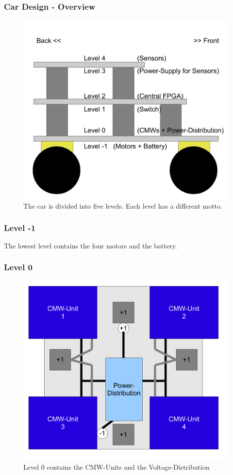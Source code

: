 \documentclass{beamer}
\begin{document}
\begin{frame}
	\frametitle{Car Design - Overview}
	\begin{figure}
	\includegraphics[scale=0.4]{figures/overview.pdf}
	\caption{The car is divided into five levels. Each level has a different motto.}
	\end{figure}
\end{frame}

\begin{frame}
	\frametitle{Level -1}
	The lowest level contains the four motors and the battery.
\end{frame}

\begin{frame}
	\frametitle{Level 0}
	\begin{figure}
	\includegraphics[scale=0.4]{figures/level0.pdf}
	\caption{Level 0 contains the CMW-Units and the Voltage-Distribution}
	\end{figure}
\end{frame}
\end{document}
